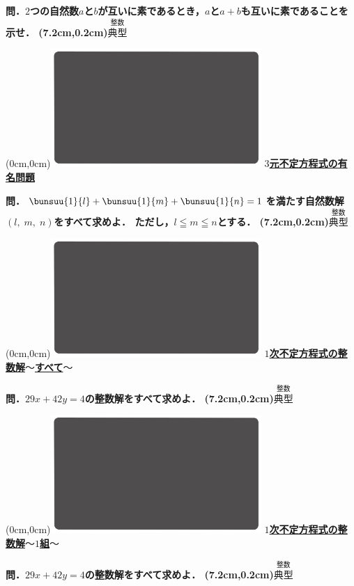 \documentclass[10pt,
fleqn,
dvipdfmx,
uplatex
]{jsarticle}
\begin{document}
\LARGE 
\bf\boldmath 問．$2$つの自然数$a$と$b$が互いに素であるとき，$a$と$a+b$も互いに素であることを示せ．
\at(7.2cm,0.2cm){\small\color{bradorange}$\overset{\text{整数}}{\text{典型}}$}


\newpage



\at(0cm,0cm){\includegraphics[width=8cm,bb=0 0 1920 1080]{./youtube/thumbnails/templates/smart_background/整数.jpeg}}
{\color{orange}\bf\boldmath\LARGE\underline{$3$元不定方程式の有名問題}}\vspace{0.3zw}

\Large 
\bf\boldmath 問．$\bunsuu{1}{l}+\bunsuu{1}{m}+\bunsuu{1}{n}=1$を満たす自然数解$\left(l,\;m,\;n\right)$をすべて求めよ．
ただし，$l\leqq m\leqq n$とする．
\at(7.2cm,0.2cm){\small\color{bradorange}$\overset{\text{整数}}{\text{典型}}$}


\newpage



\at(0cm,0cm){\includegraphics[width=8cm,bb=0 0 1920 1080]{./youtube/thumbnails/templates/smart_background/整数.jpeg}}
{\color{orange}\bf\boldmath\large\underline{$1$次不定方程式の整数解$〜$すべて$〜$}}\vspace{0.3zw}

\huge 
\bf\boldmath 問．${29}x+{42}y=4$の整数解をすべて求めよ．
\at(7.2cm,0.2cm){\small\color{bradorange}$\overset{\text{整数}}{\text{典型}}$}


\newpage



\at(0cm,0cm){\includegraphics[width=8cm,bb=0 0 1920 1080]{./youtube/thumbnails/templates/smart_background/整数.jpeg}}
{\color{orange}\bf\boldmath\large\underline{$1$次不定方程式の整数解$〜1$組$〜$}}\vspace{0.3zw}

\huge 
\bf\boldmath 問．${29}x+{42}y=4$の整数解をすべて求めよ．
\at(7.2cm,0.2cm){\small\color{bradorange}$\overset{\text{整数}}{\text{典型}}$}
\end{document}
